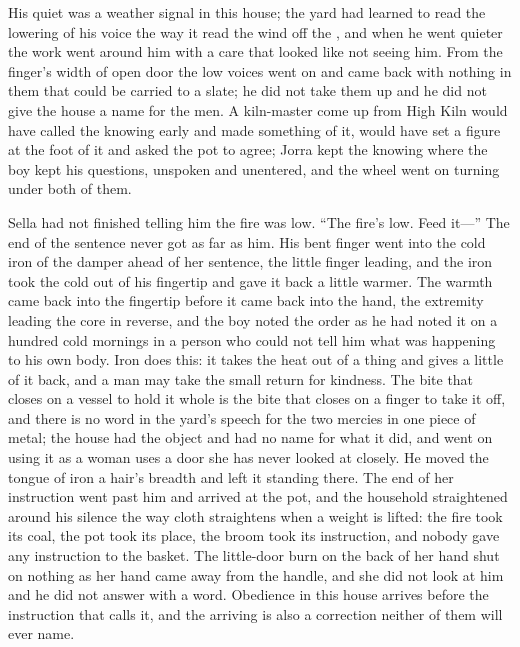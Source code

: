 His quiet was a weather signal in this house; the yard had learned to read the lowering of his voice the way it read the wind off the , and when he went quieter the work went around him with a care that looked like not seeing him. From the finger's width of open door the low voices went on and came back with nothing in them that could be carried to a slate; he did not take them up and he did not give the house a name for the men. A kiln-master come up from High Kiln would have called the knowing early and made something of it, would have set a figure at the foot of it and asked the pot to agree; Jorra kept the knowing where the boy kept his questions, unspoken and unentered, and the wheel went on turning under both of them.

Sella had not finished telling him the fire was low. “The fire's low. Feed it---” The end of the sentence never got as far as him. His bent finger went into the cold iron of the damper ahead of her sentence, the little finger leading, and the iron took the cold out of his fingertip and gave it back a little warmer. The warmth came back into the fingertip before it came back into the hand, the extremity leading the core in reverse, and the boy noted the order as he had noted it on a hundred cold mornings in a person who could not tell him what was happening to his own body. Iron does this: it takes the heat out of a thing and gives a little of it back, and a man may take the small return for kindness. The bite that closes on a vessel to hold it whole is the bite that closes on a finger to take it off, and there is no word in the yard's speech for the two mercies in one piece of metal; the house had the object and had no name for what it did, and went on using it as a woman uses a door she has never looked at closely. He moved the tongue of iron a hair's breadth and left it standing there. The end of her instruction went past him and arrived at the pot, and the household straightened around his silence the way cloth straightens when a weight is lifted: the fire took its coal, the pot took its place, the broom took its instruction, and nobody gave any instruction to the basket. The little-door burn on the back of her hand shut on nothing as her hand came away from the handle, and she did not look at him and he did not answer with a word. Obedience in this house arrives before the instruction that calls it, and the arriving is also a correction neither of them will ever name.

